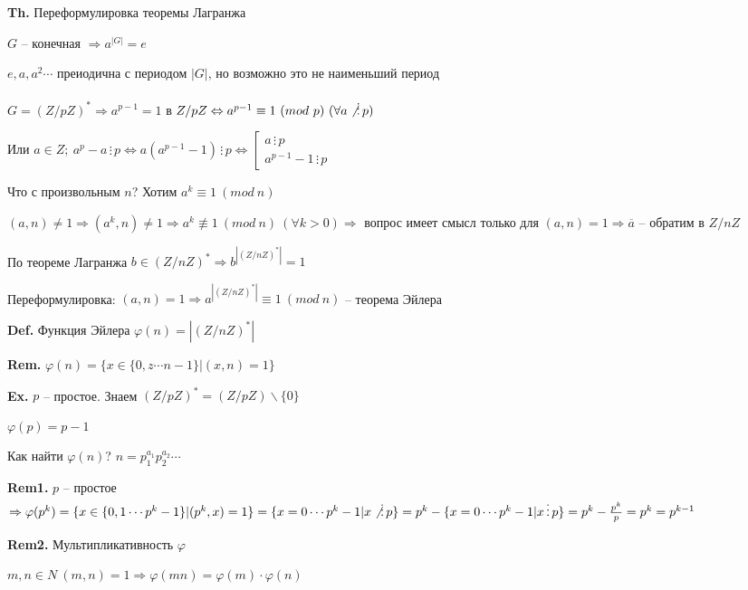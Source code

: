 \documentclass[14pt, letter paper]{article}
\begin{document}
\vspace{5mm}

\textbf{Th.} Переформулировка теоремы Лагранжа

$G$ -- конечная $\Rightarrow a^{|G|} = e$

$e, a, a^2 \cdots$ преиодична с периодом $|G|$, но возможно это не наименьший период

$G = (Z/pZ)^* \Rightarrow a^{p-1} = 1$ в $Z/pZ \Leftrightarrow a^{p-1} \equiv 1\ (mod\ p)\ (\forall a \not\, \vdots \, p)$

Или $a \in Z;\ a^p - a \, \vdots \, p \Leftrightarrow a(a^{p-1}-1) \, \vdots \, p \Leftrightarrow \left[ \begin{gathered}
    a \, \vdots \, p \\
    a^{p-1} - 1 \, \vdots \, p
\end{gathered} \right.$
\vspace{5mm}

Что с произвольным $n$? Хотим $a^k \equiv 1\ (mod\ n)$

$(a, n) \neq 1 \Rightarrow (a^k, n) \neq 1 \Rightarrow a^k \not\equiv 1\ (mod\ n)\ (\forall k > 0) \Rightarrow$ вопрос имеет смысл только для $(a, n) = 1 \Rightarrow \overline{a}$ -- обратим в $Z/nZ$

По теореме Лагранжа $b \in (Z/nZ)^* \Rightarrow b^{|(Z/nZ)^*|} = 1$

Переформулировка: $(a, n) = 1 \Rightarrow a^{|(Z/nZ)^*|} \equiv 1\ (mod\ n)$ -- теорема Эйлера

\vspace{5mm}

\textbf{Def.} Функция Эйлера $\varphi(n) = |(Z/nZ)^*|$

\textbf{Rem.} $\varphi(n) = \{x \in \{0, z \cdots n-1\} | (x, n) = 1\}$

\textbf{Ex.} $p$ -- простое. Знаем $(Z/pZ)^* = (Z/pZ) \backslash \{0\}$

$\varphi(p) = p - 1$

Как найти $\varphi(n)$? $n = p_1^{a_1} p_2^{a_2} \cdots$

\textbf{Rem1.} $p$ -- простое $\Rightarrow \varphi(p^k) = \{x \in \{0, 1 \cdots p^k-1\}| (p^k, x) = 1\} = \{x = 0 \cdots p^k-1| x \not\, \vdots \, p\} = p^k - \{x = 0 \cdots p^k-1| x \, \vdots \, p\} = p^k - \frac{p^k}{p} = p^k = p^{k-1}$

\textbf{Rem2.} Мультипликативность $\varphi$

$m, n \in N\ (m, n) = 1 \Rightarrow \varphi(mn) = \varphi(m) \cdot \varphi(n)$
\end{document}
